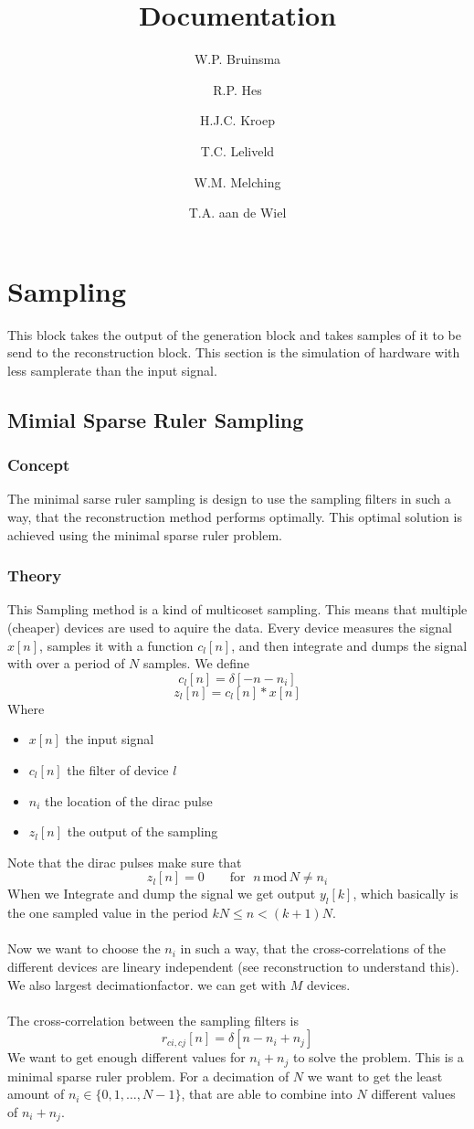 \documentclass[report, oneside, a4paper, openany]{memoir}
\title{Documentation}
\author{W.P. Bruinsma \and R.P. Hes \and H.J.C. Kroep \and T.C. Leliveld \and W.M. Melching \and T.A. aan de Wiel}
\begin{document}
\chapter{Sampling}
This block takes the output of the generation block and takes samples of it to be send to the reconstruction block. 
This section is the simulation of hardware with less samplerate than the input signal.


\section{Mimial Sparse Ruler Sampling}
\subsection{Concept}
The minimal sarse ruler sampling is design to use the sampling filters in such a way, that the reconstruction method performs optimally. This optimal solution is achieved using the minimal sparse ruler problem.
\subsection{Theory}
This Sampling method is a kind of multicoset sampling. This means that multiple (cheaper) devices are used to aquire the data. Every device measures the signal $x[n]$, samples it with a function $c_l[n]$, and then integrate and dumps the signal with over a period of $N$ samples. We define 
$$
c_l[n] = \delta[-n -n_i]
$$
$$
z_l[n] = c_l[n]\ast x[n] 
$$
Where
\begin{itemize}
\item $x[n]$ the input signal
\item $c_l[n]$ the filter of device $l$
\item $n_i$ the location of the dirac pulse
\item $z_l[n]$ the output of the sampling
\end{itemize}
Note that the dirac pulses make sure that
$$z_l[n]=0 \quad \quad \text{for }\;n\,\text{mod}\,N\neq n_i$$
When we Integrate and dump the signal we get output $y_l[k]$, which basically is the one sampled value in the period $kN\leq n<(k+1)N$.\\
\\
Now we want to choose the $n_i$ in such a way, that the cross-correlations of the different devices are lineary independent (see reconstruction to understand this). We also largest decimationfactor. we can get with $M$ devices.\\
\\
The cross-correlation between the sampling filters is 
$$
r_{ci,cj}[n] = \delta [n-n_i+n_j]
$$
We want to get enough different values for $n_i+n_j$ to solve the problem. This is a minimal sparse ruler problem. For a decimation of $N$ we want to get the least amount of $n_i \in \{0,1,\dots,N-1\}$, that are able to combine into $N$ different values of $n_i+n_j$. 
\end{document}
